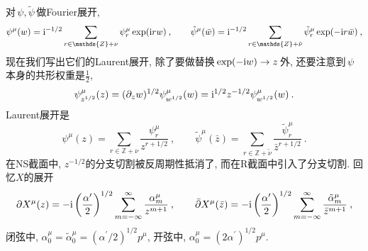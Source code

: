对$\,\psi,\tilde{\psi}\,$做Fourier展开,
\begin{equation}
    \psi^{\mu}(w) =\mi^{-1/2} \sum_{r\in\mathds{Z}+\nu}\psi^{\mu}_{r}\exp(\mi r w)\:, \qquad
    \tilde{\psi}^{\mu}(\bar{w})=\mi^{-1/2} \sum_{r\in\mathds{Z}+\tilde{\nu}}\tilde{\psi}^{\mu}_{r}\exp(-\mi r\bar{w})\:,
    \label{10.2.5}
\end{equation}
现在我们写出它们的Laurent展开, 除了要做替换$\,\exp(-\mathrm{i} w)\to z$\,外, 还要注意到$\,\psi\,$本身的共形权重是$\frac{1}{2}$,
\begin{equation}
    \psi^{\mu}_{z^{1/2}}(z)=(\partial_{z}w)^{1/2}\psi_{w^{1/2}}^{\mu}(w)
    =\mathrm{i}^{1/2}z^{-1/2}\psi^{\mu}_{w^{1/2}}(w) \:. \label{10.2.6}
\end{equation}
Laurent展开是
\begin{equation}
    \psi^{\mu}(z) = \sum_{r\in\mathds{Z}+\nu}\frac{\psi^{\mu}_{r}}{z^{r+1/2}}\:, \qquad
    \tilde{\psi}^{\mu}(\bar{z})=\sum_{r\in\mathds{Z}+\tilde{\nu}}\frac{\tilde{\psi}^{\mu}_{r}}{\bar{z}^{r+1/2}}\:.
    \label{10.2.7}
\end{equation}
在NS截面中, $z^{-1/2}$的分支切割被反周期性抵消了, 而在R截面中引入了分支切割. 回忆$X$的展开
\begin{equation}
    \partial X^{\mu}(z)=-\mathrm{i}\left(\frac{\alpha^{\prime}}{2}\right)^{1/2} \sum_{m=-\infty}^{\infty}\frac{\alpha_{m}^{\mu}}{z^{m+1}} \:, \qquad
    \bar{\partial} X^{\mu}(\bar{z}) =-\mathrm{i}\left(\frac{\alpha^{\prime}}{2}\right)^{1/2} \sum_{m=-\infty}^{\infty}
    \frac{\tilde{\alpha}_{m}^{\mu}}{\bar{z}^{m+1}} \:, \label{10.2.8}
\end{equation}
闭弦中, $\alpha^{\mu}_{0}=\tilde{\alpha}_{0}^{\mu}=(\alpha^{\prime}/2)^{1/2}p^{\mu}$, 开弦中, $\alpha^{\mu}_{0}=(2\alpha^{\prime})^{1/2}p^{\mu}$.


